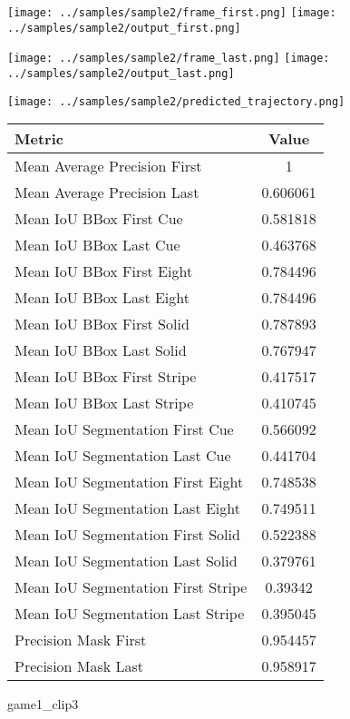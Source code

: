 \begin{figure}
\texttt{[image: ../samples/sample2/frame\_first.png]}
\texttt{[image: ../samples/sample2/output\_first.png]}\par
\texttt{[image: ../samples/sample2/frame\_last.png]}
\texttt{[image: ../samples/sample2/output\_last.png]}\par
\centering
\texttt{[image: ../samples/sample2/predicted\_trajectory.png]}
\caption{game1\_clip3}
\vspace{10pt}
\begin{tabular}{|l|c|}
\hline
\textbf{Metric} & \textbf{Value} \\
\hline
Mean Average Precision First & 1 \\
Mean Average Precision Last & 0.606061 \\
\hline
Mean IoU BBox First Cue & 0.581818 \\
Mean IoU BBox Last Cue & 0.463768 \\
Mean IoU BBox First Eight & 0.784496 \\
Mean IoU BBox Last Eight & 0.784496 \\
Mean IoU BBox First Solid & 0.787893 \\
Mean IoU BBox Last Solid & 0.767947 \\
Mean IoU BBox First Stripe & 0.417517 \\
Mean IoU BBox Last Stripe & 0.410745 \\
\hline
Mean IoU Segmentation First Cue & 0.566092 \\
Mean IoU Segmentation Last Cue & 0.441704 \\
Mean IoU Segmentation First Eight & 0.748538 \\
Mean IoU Segmentation Last Eight & 0.749511 \\
Mean IoU Segmentation First Solid & 0.522388 \\
Mean IoU Segmentation Last Solid & 0.379761 \\
Mean IoU Segmentation First Stripe & 0.39342 \\
Mean IoU Segmentation Last Stripe & 0.395045 \\
\hline
Precision Mask First & 0.954457 \\
Precision Mask Last & 0.958917 \\
\hline
\end{tabular}
\end{figure}

